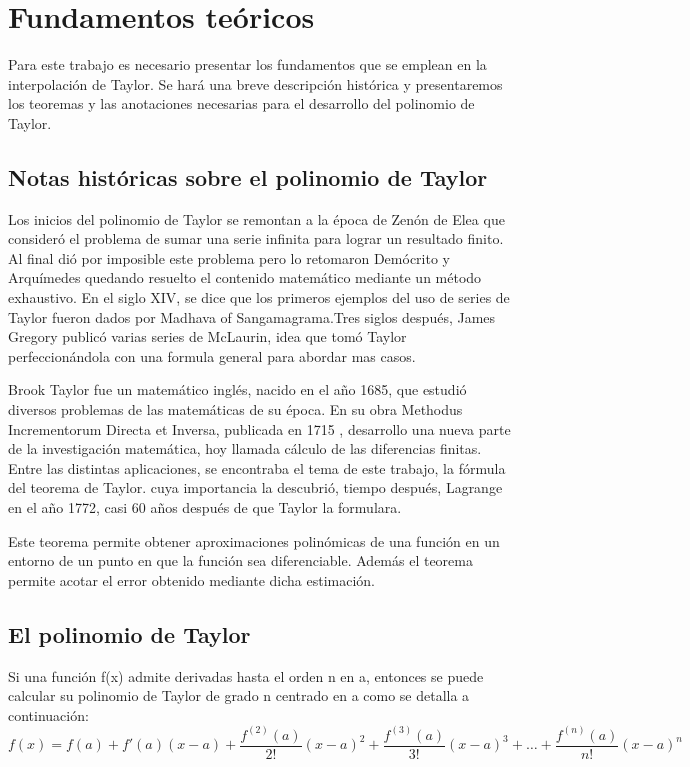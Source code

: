 \documentclass[a4paper,12pt]{report}
\begin{document}
\chapter{Fundamentos teóricos}
Para este trabajo es necesario presentar los fundamentos que se emplean en la interpolación de Taylor.
Se hará una breve descripción histórica y presentaremos los teoremas y las anotaciones necesarias para el desarrollo del polinomio de Taylor.
\section{Notas históricas sobre el polinomio de Taylor}
Los inicios del polinomio de Taylor se remontan a la época de Zenón de Elea que consideró el problema de sumar una serie infinita para lograr un resultado finito.
Al final dió por imposible este problema pero lo retomaron Demócrito y Arquímedes quedando resuelto el contenido matemático mediante un método exhaustivo.
En el siglo XIV, se dice que los primeros ejemplos del uso de series de Taylor fueron dados por Madhava of Sangamagrama.Tres siglos después, James Gregory publicó varias
series de McLaurin, idea que tomó Taylor perfeccionándola con una formula general para abordar mas casos.

Brook Taylor fue un matemático inglés, nacido en el año 1685, que estudió diversos problemas de las
matemáticas de su época. En su obra Methodus Incrementorum Directa et Inversa, publicada en 1715 ,
desarrollo una nueva parte de la investigación matemática, hoy llamada cálculo de las diferencias finitas.
Entre las distintas aplicaciones, se encontraba el tema de este trabajo, la fórmula del teorema de Taylor.
cuya importancia la descubrió, tiempo después, Lagrange en el año 1772, casi 60 años después de que Taylor
la formulara.
  
Este teorema permite obtener aproximaciones polinómicas de una función en un entorno de un punto en que la función sea diferenciable.
Además el teorema permite acotar el error obtenido mediante dicha estimación.
\section{El polinomio de Taylor}
Si una función f(x) admite derivadas hasta el orden n en a, entonces se puede calcular su 
polinomio de Taylor de grado n centrado en a como se detalla a continuación:
\begin{displaymath}
f(x) = f(a)+f'(a)(x-a) + \frac{f^{(2)}(a)}{2!}(x-a)^2 + \frac{f^{(3)}(a)}{3!}(x-a)^3 + \ldots{} + \frac{f^{(n)}(a)}{n!}(x-a)^n
\end{displaymath}
\end{document}
